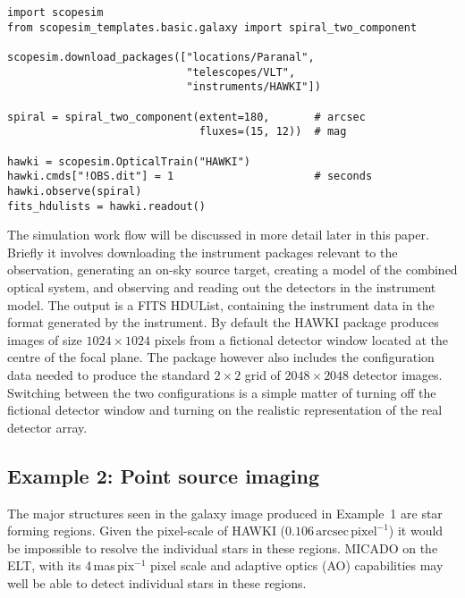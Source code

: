 \begin{lstlisting}[frame=single]
import scopesim
from scopesim_templates.basic.galaxy import spiral_two_component

scopesim.download_packages(["locations/Paranal",
                            "telescopes/VLT",
                            "instruments/HAWKI"])

spiral = spiral_two_component(extent=180,       # arcsec
                              fluxes=(15, 12))  # mag

hawki = scopesim.OpticalTrain("HAWKI")
hawki.cmds["!OBS.dit"] = 1                      # seconds
hawki.observe(spiral)
fits_hdulists = hawki.readout()
\end{lstlisting}

The simulation work flow will be discussed in more detail later in this paper.
Briefly it involves downloading the instrument packages relevant to the observation, generating an on-sky source target, creating a model of the combined optical system, and observing and reading out the detectors in the instrument model.
The output is a FITS HDUList, containing the instrument data in the format generated by the instrument.
By default the HAWKI package produces images of size $1024\times 1024$ pixels from a fictional detector window located at the centre of the focal plane.
The package however also includes the configuration data needed to produce the standard $2\times2$ grid of $2048\times 2048$ detector images.
Switching between the two configurations is a simple matter of turning off the fictional detector window and turning on the realistic representation of the real detector array.


\subsection{Example 2: Point source imaging}
\label{example-2-point-source-imaging}

The major structures seen in the galaxy image produced in Example~1 are star forming regions.
Given the pixel-scale of HAWKI ($0.106\,\mathrm{arcsec\,pixel^{-1}}$) it would be impossible to resolve the individual stars in these regions.
MICADO on the ELT, with its 4\,mas\,pix$^{-1}$ pixel scale\cite{micado2018} and adaptive optics (AO) capabilities may well be able to detect individual stars in these regions.

